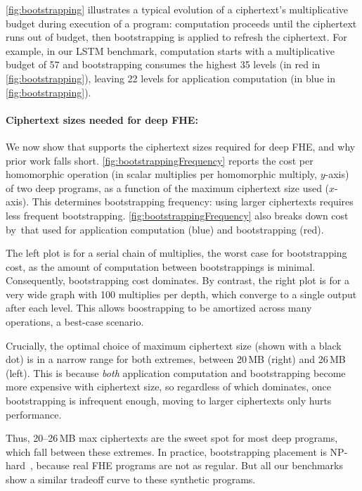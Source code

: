 \autoref{fig:bootstrapping} illustrates a typical evolution of a ciphertext's
multiplicative budget during execution of a program: computation proceeds until
the ciphertext runs out of budget, then bootstrapping is applied to refresh the
ciphertext. For example, in our LSTM benchmark, computation starts with a
multiplicative budget of 57 and bootstrapping consumes the highest 35 levels
(in red in \autoref{fig:bootstrapping}), leaving 22 levels for application
computation (in blue in \autoref{fig:bootstrapping}).


\paragraph{Ciphertext sizes needed for deep FHE:}
We now show that \name supports the ciphertext sizes required for deep FHE, and
why prior work falls short. \autoref{fig:bootstrappingFrequency} reports the
cost per homomorphic operation (in scalar multiplies per homomorphic multiply,
$y$-axis) of two deep programs, as a function of the maximum ciphertext size
used ($x$-axis). This determines bootstrapping frequency: using larger
ciphertexts requires less frequent bootstrapping.
\autoref{fig:bootstrappingFrequency} also breaks down cost by~that used for
application computation (blue) and bootstrapping (red).

The left plot is for a serial chain of multiplies, the worst case for
bootstrapping cost, as the amount of computation between bootstrappings is
minimal. Consequently, bootstrapping cost dominates. By contrast, the right
plot is for a very wide graph with 100 multiplies per depth, which converge to
a single output after each level. This allows boostrapping to be amortized
across many operations, a best-case scenario.

Crucially, the optimal choice of maximum ciphertext size (shown with a black
dot) is in a narrow range for both extremes, between 20\,MB (right) and 26\,MB
(left). This is because \emph{both} application computation and bootstrapping
become more expensive with ciphertext size, so regardless of which dominates,
once bootstrapping is infrequent enough, moving to larger ciphertexts only
hurts performance.

Thus, 20--26\,MB max ciphertexts are the sweet spot for most deep programs,
which fall between these extremes. In practice, bootstrapping placement is
NP-hard~\cite{benhamouda2017optimization}, because real FHE programs are not as
regular. But all our benchmarks show a similar tradeoff curve to these
synthetic programs.

